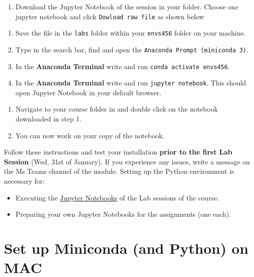 \documentclass[
  letterpaper,
  DIV=11,
  numbers=noendperiod]{scrreprt}
\providecommand{\tightlist}{%
  \setlength{\itemsep}{0pt}\setlength{\parskip}{0pt}}\usepackage{longtable,booktabs,array}
\begin{document}
\begin{enumerate}
\def\labelenumi{\arabic{enumi}.}
\tightlist
\item
  Download the Jupyter Notebook of the session in your folder. Choose
  one jupyter notebook and click \texttt{Dowload\ raw\ file} as shown
  below
\end{enumerate}

\begin{enumerate}
\def\labelenumi{\arabic{enumi}.}
\setcounter{enumi}{1}
\tightlist
\item
  Save the file in the \texttt{labs} folder within your \texttt{envs456}
  folder on your machine.
\item
  Type in the search bar, find and open the
  \texttt{Anaconda\ Prompt\ (miniconda\ 3)}.
\item
  In the \textbf{Anaconda Terminal} write and run
  \texttt{conda\ activate\ envs456}.
\item
  In the \textbf{Anaconda Terminal} write and run
  \texttt{jupyter\ notebook}. This should open Jupyter Notebook in your
  default browser.
\end{enumerate}

\begin{enumerate}
\def\labelenumi{\arabic{enumi}.}
\setcounter{enumi}{5}
\tightlist
\item
  Navigate to your course folder in and double click on the notebook
  downloaded in step 1.
\item
  You can now work on your copy of the notebook.
\end{enumerate}

Follow these instructions and test your installation \textbf{prior to
the first Lab Session} (Wed, 31st of January). If you experience any
issues, write a message on the Ms Teams channel of the module. Setting
up the Python environment is necessary for:

\begin{itemize}
\tightlist
\item
  Executing the \href{https://docs.jupyter.org/en/latest/}{Jupyter
  Notebooks} of the Lab sessions of the course.
\item
  Preparing your own Jupyter Notebooks for the assignments (one each).
\end{itemize}

\hypertarget{set-up-miniconda-and-python-on-mac}{%
\section*{Set up Miniconda (and Python) on
MAC}\label{set-up-miniconda-and-python-on-mac}}
\end{document}
